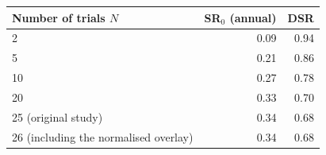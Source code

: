 \begin{tabular}{lrr}
\toprule
Number of trials $N$ & SR$_0$ (annual) & DSR \\
\midrule
2 & 0.09 & 0.94 \\
5 & 0.21 & 0.86 \\
10 & 0.27 & 0.78 \\
20 & 0.33 & 0.70 \\
25 (original study) & 0.34 & 0.68 \\
26 (including the normalised overlay) & 0.34 & 0.68 \\
\bottomrule
\end{tabular}
